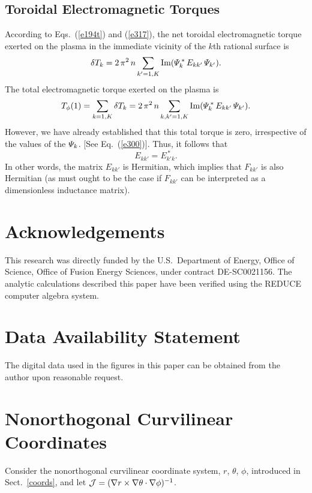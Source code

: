 \documentclass[12pt,prb,aps]{revtex4-1}
\begin{document}
\subsection{Toroidal Electromagnetic Torques}
According to Eqs.~(\ref{e194t}) and (\ref{e317}), the net toroidal electromagnetic torque exerted on the plasma
in the immediate vicinity of the $k$th rational surface is
\begin{equation}
\delta T_k = 2\,\pi^2\,n\sum_{k'=1,K} {\rm Im}({\mit\Psi}_k^{\,\ast}\,E_{kk'}\,{\mit\Psi}_{k'}).
\end{equation}
The total electromagnetic torque exerted on the plasma is
\begin{equation}
T_\phi(1) = \sum_{k=1,K}\delta T_k =  2\,\pi^2\,n\sum_{k,k'=1,K} {\rm Im}({\mit\Psi}_k^{\,\ast}\,E_{kk'}\,{\mit\Psi}_{k'}).
\end{equation}
However, we have already established that this total torque is zero, irrespective of the values of the ${\mit\Psi}_k$. [See Eq.~(\ref{e300})].
Thus, it follows that
\begin{equation}
E_{kk'} = E_{k'k}^{\,\ast}.
\end{equation}
In other words, the matrix $E_{kk'}$ is Hermitian,\cite{am1} which implies that $F_{kk'}$ is also Hermitian (as must ought to be the case if $F_{kk'}$ can
be interpreted as 
a dimensionless inductance matrix). 

\section*{Acknowledgements}
This research was directly funded by the U.S.\ Department of Energy, Office of Science, Office of Fusion Energy Sciences, under  contract DE-SC0021156. 
The analytic calculations  described  this paper have been verified using the {\sc REDUCE} computer algebra system.

\section*{Data Availability Statement}
The digital data used in the figures in this paper can be obtained from the author upon reasonable request.

\appendix
\section{Nonorthogonal Curvilinear Coordinates}\label{s2}
Consider the nonorthogonal curvilinear coordinate system, $r$, $\theta$, $\phi$,  introduced in Sect.~\ref{coords}, and let
${\cal J}=  (\nabla r\times \nabla\theta\cdot\nabla\phi)^{-1}$.
\end{document}
